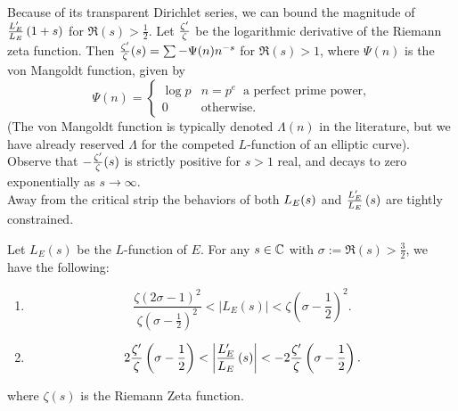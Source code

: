 Because of its transparent Dirichlet series, we can bound the magnitude of $\frac{L_E^{\prime}}{L_E}\left(1+s\right)$ for $\Re(s)>\frac{1}{2}$. Let $\frac{\zeta^{\prime}}{\zeta}$ be the logarithmic derivative of the Riemann zeta function. Then $\frac{\zeta^{\prime}}{\zeta}(s) = \sum -\Psi(n) n^{-s}$ for $\Re(s)>1$, where $\Psi(n)$ is the von Mangoldt function, given by
\begin{equation}\label{eqn:vonmangoldt}
\Psi(n) = \begin{cases} \log p & n = p^e \;\;\text{a perfect prime power,} \\ 0 & \text{otherwise.} \end{cases}
\end{equation}
(The von Mangoldt function is typically denoted $\Lambda(n)$ in the literature, but we have already reserved $\Lambda$ for the competed $L$-function of an elliptic curve). Observe that $-\frac{\zeta^{\prime}}{\zeta}(s)$ is strictly positive for $s > 1$ real, and decays to zero exponentially as $s \to \infty$. \\

Away from the critical strip the behaviors of both $L_E(s)$ and $\frac{L_E^{\prime}}{L_E}\left(s\right)$ are tightly constrained.
\begin{lemma}\label{lem:ldLe_bound}
Let $L_E(s)$ be the $L$-function of $E$. For any $s \in \mathbb{C}$ with $\sigma := \Re(s) >\frac{3}{2}$, we have the following:
\begin{enumerate}
\item
\begin{equation}\label{ineq:bounds_on_Les}
\frac{\zeta(2\sigma-1)^2}{\zeta(\sigma-\frac{1}{2})^2} < \left|L_E(s)\right| < \zeta\left(\sigma-\frac{1}{2}\right)^2.
\end{equation}
\item
\begin{equation}\label{ineq:bounds_on_Ldles}
2\frac{\zeta^{\prime}}{\zeta}\left(\sigma-\frac{1}{2}\right) < \left| \frac{L_E^{\prime}}{L_E}\left(s\right)\right| < -2\frac{\zeta^{\prime}}{\zeta}\left(\sigma-\frac{1}{2}\right).
\end{equation}
\end{enumerate}
where $\zeta(s)$ is the Riemann Zeta function.
\end{lemma}

